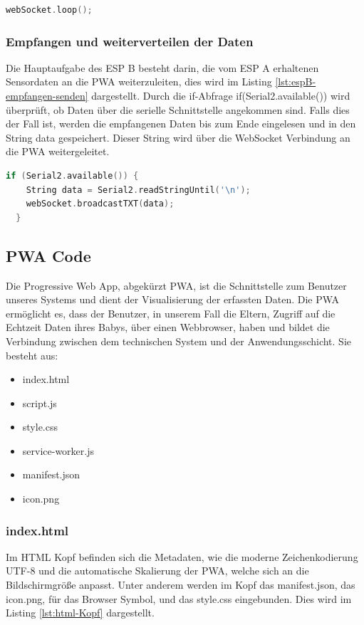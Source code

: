 \begin{lstlisting}[language=C++, caption={webSocket.loop()}, label={lst:espB-webSocket-loop}, firstnumber=80]
  webSocket.loop();
\end{lstlisting}

\subsubsection{Empfangen und weiterverteilen der Daten}
Die Hauptaufgabe des ESP B besteht darin, die vom ESP A erhaltenen Sensordaten an die PWA weiterzuleiten, 
dies wird im Listing \ref{lst:espB-empfangen-senden} dargestellt. Durch die if-Abfrage if(Serial2.available()) wird überprüft, ob Daten über die serielle Schnittstelle angekommen sind. Falls dies der Fall ist, werden die empfangenen Daten bis zum Ende eingelesen und in den String data gespeichert. Dieser String wird über die WebSocket Verbindung an die PWA weitergeleitet.

\begin{lstlisting}[language=C++, caption={webSocket.loop()}, label={lst:espB-empfangen-senden}, firstnumber=83]
  if (Serial2.available()) {
    String data = Serial2.readStringUntil('\n');
    webSocket.broadcastTXT(data);
  }
\end{lstlisting}

\subsection[PWA Code]{PWA Code}
Die Progressive Web App, abgekürzt PWA, ist die Schnittstelle zum Benutzer unseres Systems und dient der Visualisierung der erfassten Daten. Die PWA ermöglicht es, dass der Benutzer, in unserem Fall die Eltern, Zugriff auf die Echtzeit Daten ihres Babys, über einen Webbrowser, haben und bildet die Verbindung zwischen dem technischen System und der Anwendungsschicht.
Sie besteht aus:
\begin{itemize}
  \item index.html
  \item script.js
  \item style.css
  \item service-worker.js
  \item manifest.json
  \item icon.png
\end{itemize}

\subsubsection{index.html}
Im HTML Kopf befinden sich die Metadaten, wie die moderne Zeichenkodierung UTF-8 und die automatische Skalierung der PWA, welche sich an die Bildschirmgröße anpasst. Unter anderem werden im Kopf das manifest.json, das icon.png, für das Browser Symbol, und das style.css eingebunden. 
Dies wird im Listing \ref{lst:html-Kopf} dargestellt.

